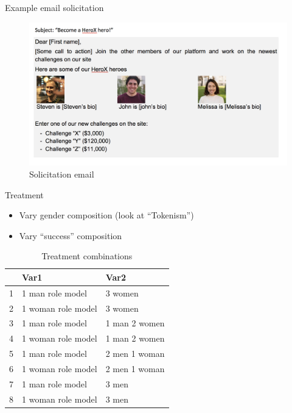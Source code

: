 \begin{frame}{Example email solicitation}

\begin{figure}
\centering
\includegraphics{solicit_gender_compo.png}
\caption{Solicitation email}
\end{figure}

\end{frame}

\begin{frame}{Treatment}

\begin{itemize}
\tightlist
\item
  Vary gender composition (look at ``Tokenism'')
\item
  Vary ``success'' composition
\end{itemize}

\begin{table}[ht]
\centering
\begin{tabular}{rll}
  \hline
 & Var1 & Var2 \\ 
  \hline
1 & 1 man role model & 3 women \\ 
  2 & 1 woman role model & 3 women \\ 
  3 & 1 man role model & 1 man 2 women \\ 
  4 & 1 woman role model & 1 man 2 women \\ 
  5 & 1 man role model & 2 men 1 woman \\ 
  6 & 1 woman role model & 2 men 1 woman \\ 
  7 & 1 man role model & 3 men \\ 
  8 & 1 woman role model & 3 men \\ 
   \hline
\end{tabular}
\caption{Treatment combinations} 
\end{table}

\end{frame}


